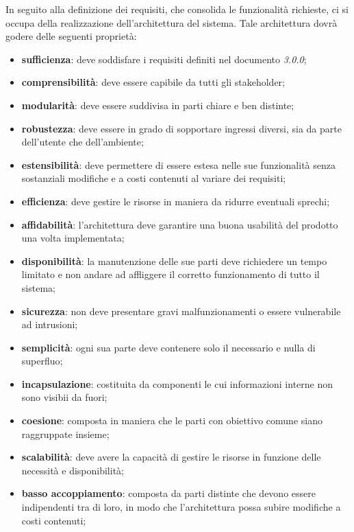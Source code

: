     	In seguito alla definizione dei requisiti, che consolida le funzionalità richieste, ci si occupa della realizzazione dell'architettura del sistema. Tale architettura dovrà godere delle seguenti proprietà:
    	\begin{itemize}
    		\item{\textbf{sufficienza}}: deve soddisfare i requisiti definiti nel documento \AdR{} \textit{3.0.0};
    		\item{\textbf{comprensibilità}}: deve essere capibile da tutti gli stakeholder;
    		\item{\textbf{modularità}}: deve essere suddivisa in parti chiare e ben distinte;
    		\item{\textbf{robustezza}}: deve essere in grado di sopportare ingressi diversi, sia da parte dell'utente che dell'ambiente;
    		\item{\textbf{estensibilità}}: deve permettere di essere estesa nelle sue funzionalità senza sostanziali modifiche e a costi contenuti al variare dei requisiti;
    		\item{\textbf{efficienza}}: deve gestire le risorse in maniera da ridurre eventuali sprechi;
    		\item{\textbf{affidabilità}}: l'architettura deve garantire una buona usabilità del prodotto una volta implementata;
    		\item{\textbf{disponibilità}}: la manutenzione delle sue parti deve richiedere un tempo limitato e non andare ad affliggere il corretto funzionamento di tutto il sistema;
    		\item{\textbf{sicurezza}}: non deve presentare gravi malfunzionamenti o essere vulnerabile ad intrusioni;
    		\item{\textbf{semplicità}}: ogni sua parte deve contenere solo il necessario e nulla di superfluo;
    		\item{\textbf{incapsulazione}}: costituita da componenti le cui informazioni interne non sono visibii da fuori;
    		\item{\textbf{coesione}}: composta in maniera che le parti con obiettivo comune siano raggruppate insieme;
    		\item{\textbf{scalabilità}}: deve avere la capacità di gestire le risorse in funzione delle necessità e disponibilità;
    		\item{\textbf{basso accoppiamento}}: composta da parti distinte che devono essere indipendenti tra di loro, in modo che l'architettura possa subire modifiche a costi contenuti;
    	\end{itemize}

